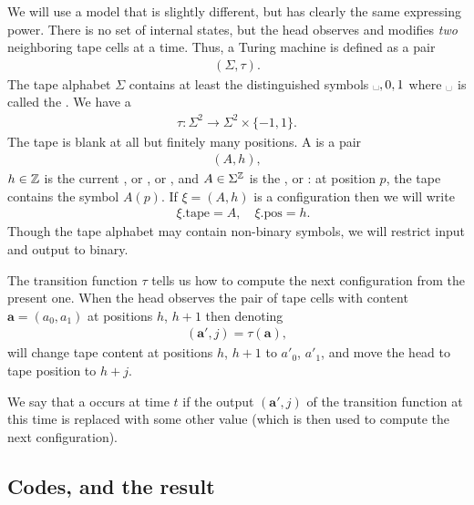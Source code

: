 \documentclass[11pt]{memoir}
\theoremstyle{definition} %
\renewcommand{\vek}[1]{\mathbf{#1}}
\newcommand{\va}{\vek{a}}
\newcommand{\blank}{\text{\textvisiblespace}}
\newcommand{\h}{h}
\newcommand{\pos}{\mathrm{pos}}
\newcommand{\tape}{\mathrm{tape}}
\begin{document}
We will use a model that is slightly different, but has clearly the same expressing power.
There is no set of internal states, but the head observes and modifies \emph{two}
neighboring tape cells at a time.
Thus, a Turing machine is defined as a pair
\begin{align*}
   (\Sigma,\tau).
 \end{align*}
The tape alphabet \( \Sigma \) contains at least the distinguished
symbols \( \blank,0,1 \) where \( \blank \) is called the .
We have a 
\begin{align*}
             \tau\colon\Sigma^{2}\to \Sigma^{2}\times\{-1,1\}.
\end{align*}
The tape is blank at all but finitely many positions.
A  is a pair 
        \begin{align*}
             (A,\h),
        \end{align*}
\( \h\in\bbZ \) is the current , or , or ,
and \( A\in\Sigma^{\mathbb{Z}} \) is the , or :
at position \( p \), the tape contains the symbol \( A(p) \).
If \( \xi=(A,\h) \) is a configuration then we will write
        \begin{align}\label{eq:config-1}
             \quad \xi.\tape=A,\quad \xi.\pos=\h.
        \end{align}
Though the tape alphabet may contain
non-binary symbols, we will restrict input and output to binary.

The transition function \( \tau \) tells us how to compute the next
configuration from the present one.
When the head observes the pair of tape cells
with content \( \va=(a_{0},a_{1}) \) at positions \( \h \), \( \h+1 \) then denoting
         \begin{align*}
           (\va',j)=\tau(\va),
         \end{align*}
will change tape content at positions \( \h \), \( \h+1 \) to \( a'_{0} \), \( a'_{1} \),
and move the head to tape position to \( \h+j \).

\begin{definition}[Fault]\label{def:fault}
We say that a  occurs at time \( t \) if the output \( (\va',j) \)
of the    transition function at this time is replaced with some other value
(which is then used to compute the next configuration).
\end{definition}


\subsection{Codes, and the result}
\end{document}
